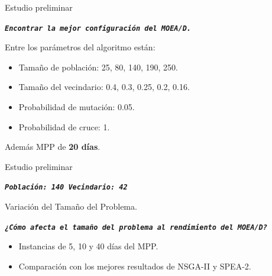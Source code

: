 \documentclass[12pt]{beamer}
\begin{document}
\begin{frame}[fragile]{Estudio preliminar}
    \begin{center}
        \texttt{\textbf{\textit{Encontrar la mejor configuración del MOEA/D.}}}
    \end{center}
    Entre los parámetros del algoritmo están:
    \begin{itemize}
        \item Tamaño de población: 25, 80, 140, 190, 250.
        \item Tamaño del vecindario: 0.4, 0.3, 0.25, 0.2, 0.16.
        \item Probabilidad de mutación: 0.05.
        \item Probabilidad de cruce: 1.
    \end{itemize}
    Además MPP de \textbf{20 días}.
\end{frame}
\begin{frame}[fragile]{Estudio preliminar}
    \begin{center}
        \texttt{\textbf{\textit{Población: 140 Vecindario: 42}}}
    \end{center}
    \begin{table}[!h]
    \centering
    \end{table}
\end{frame}
\begin{frame}[fragile]{Variación del Tamaño del Problema.}
    \begin{center}
        \texttt{\textbf{\textit{¿Cómo afecta el tamaño del problema al rendimiento del MOEA/D?}}}
    \end{center}
    \begin{itemize}
        \item Instancias de 5, 10 y 40 días del MPP.
        \item Comparación con los mejores resultados de NSGA-II y SPEA-2.
    \end{itemize}
\end{frame}
\end{document}
